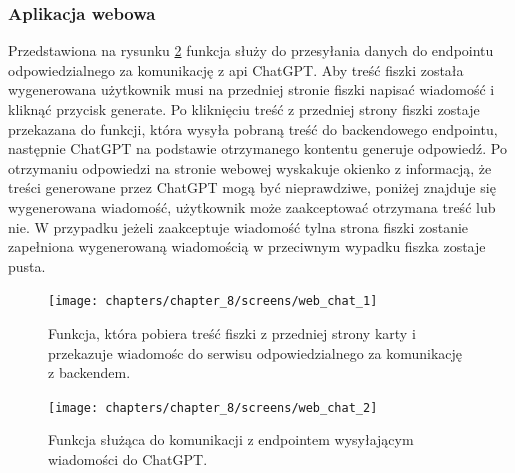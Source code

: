\subsubsection{Aplikacja webowa}
Przedstawiona na rysunku \ref{img:web_chat_2} funkcja służy do przesyłania danych do endpointu odpowiedzialnego za
komunikację z api ChatGPT. Aby treść fiszki została wygenerowana użytkownik musi na przedniej stronie fiszki napisać
wiadomość i kliknąć przycisk generate. Po kliknięciu treść z przedniej strony fiszki zostaje przekazana
do funkcji, która wysyła pobraną treść do backendowego endpointu, następnie ChatGPT na podstawie
otrzymanego kontentu generuje odpowiedź. Po otrzymaniu odpowiedzi na stronie webowej wyskakuje
okienko z informacją, że treści generowane przez ChatGPT mogą być nieprawdziwe, poniżej znajduje się
wygenerowana wiadomość, użytkownik może zaakceptować otrzymana treść lub nie. W przypadku jeżeli
zaakceptuje wiadomość tylna strona fiszki zostanie zapełniona wygenerowaną wiadomością w przeciwnym
wypadku fiszka zostaje pusta.

\begin{figure}[H]
    \centering
    \texttt{[image: chapters/chapter\_8/screens/web\_chat\_1]}
    \caption{Funkcja, która pobiera treść fiszki z przedniej strony karty i przekazuje wiadomośc do serwisu odpowiedzialnego za komunikację z backendem.}
    \label{img:web_chat_1}
\end{figure}

\begin{figure}[H]
    \centering
    \texttt{[image: chapters/chapter\_8/screens/web\_chat\_2]}
    \caption{Funkcja służąca do komunikacji z endpointem wysyłającym wiadomości do ChatGPT.}
    \label{img:web_chat_2}
\end{figure}